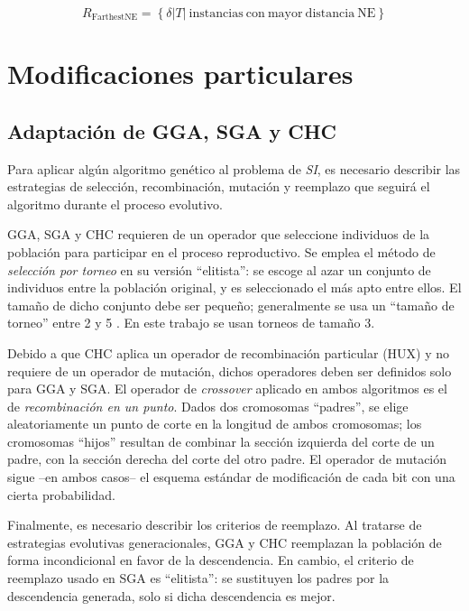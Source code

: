 \begin{equation}
R_\mathrm{FarthestNE} = \left\lbrace \delta \vert T \vert\ \mathrm{instancias\ con\ mayor\ distancia\ NE} \right\rbrace
\end{equation}

\section{Modificaciones particulares}

\subsection{Adaptación de GGA, SGA y CHC}

Para aplicar algún algoritmo genético al problema de \emph{SI}, es necesario describir las estrategias de selección, recombinación, mutación y reemplazo que seguirá el algoritmo durante el proceso evolutivo.

GGA, SGA y CHC requieren de un operador que seleccione individuos de la población para participar en el proceso reproductivo. Se emplea el método de \emph{selección por torneo} en su versión ``elitista'': se escoge al azar un conjunto de individuos entre la población original, y es seleccionado el más apto entre ellos. El tamaño de dicho conjunto debe ser pequeño; generalmente se usa un ``tamaño de torneo'' entre 2 y 5 \cite{Miller95geneticalgorithms}. En este trabajo se usan torneos de tamaño 3.

Debido a que CHC aplica un operador de recombinación particular (HUX) y no requiere de un operador de mutación, dichos operadores deben ser definidos solo para GGA y SGA. El operador de \emph{crossover} aplicado en ambos algoritmos es el de \emph{recombinación en un punto}. Dados dos cromosomas ``padres'', se elige aleatoriamente un punto de corte en la longitud de ambos cromosomas; los cromosomas ``hijos'' resultan de combinar la sección izquierda del corte de un padre, con la sección derecha del corte del otro padre. El operador de mutación sigue --en ambos casos-- el esquema estándar de modificación de cada bit con una cierta probabilidad.

Finalmente, es necesario describir los criterios de reemplazo. Al tratarse de estrategias evolutivas generacionales, GGA y CHC reemplazan la población de forma incondicional en favor de la descendencia. En cambio, el criterio de reemplazo usado en SGA es ``elitista'': se sustituyen los padres por la descendencia generada, solo si dicha descendencia es mejor.

